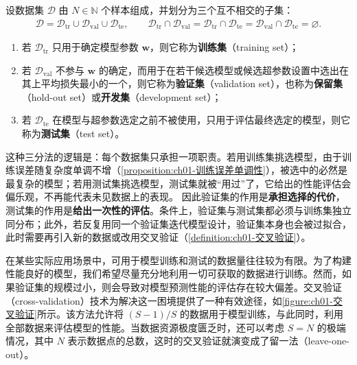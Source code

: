 \documentclass[../../main.tex]{subfiles}
\begin{document}
\begin{definition}[验证集与测试集]\label{definition:ch01-验证集与测试集}
设数据集 $\mathcal{D}$ 由 $N\in\mathbb{N}$ 个样本组成，并划分为三个互不相交的子集：
\begin{align*}
  \mathcal{D}=\mathcal{D}_{\mathrm{tr}}\cup\mathcal{D}_{\mathrm{val}}\cup\mathcal{D}_{\mathrm{te}},\qquad
  \mathcal{D}_{\mathrm{tr}}\cap\mathcal{D}_{\mathrm{val}}=\mathcal{D}_{\mathrm{tr}}\cap\mathcal{D}_{\mathrm{te}}=\mathcal{D}_{\mathrm{val}}\cap\mathcal{D}_{\mathrm{te}}=\varnothing .
\end{align*}
\begin{enumerate}
  \item 若 $\mathcal{D}_{\mathrm{tr}}$ 只用于确定模型参数 $\mathbf{w}$，则它称为\textbf{训练集}（training set）；
  \item 若 $\mathcal{D}_{\mathrm{val}}$ 不参与 $\mathbf{w}$ 的确定，而用于在若干候选模型或候选超参数设置中选出在其上平均损失最小的一个，则它称为\textbf{验证集}（validation set），也称为\textbf{保留集}（hold-out set）或\textbf{开发集}（development set）；
  \item 若 $\mathcal{D}_{\mathrm{te}}$ 在模型与超参数选定之前不被使用，只用于评估最终选定的模型，则它称为\textbf{测试集}（test set）。
\end{enumerate}
\end{definition}

\begin{remark}
这种三分法的逻辑是：每个数据集只承担一项职责。若用训练集挑选模型，由于训练误差随复杂度单调不增（\cref{proposition:ch01-训练误差单调性}），被选中的必然是最复杂的模型；若用测试集挑选模型，测试集就被“用过”了，它给出的性能评估会偏乐观，不再能代表未见数据上的表现。
因此验证集的作用是\textbf{承担选择的代价}，测试集的作用是\textbf{给出一次性的评估}。条件上，验证集与测试集都必须与训练集独立同分布；此外，若反复用同一个验证集迭代模型设计，验证集本身也会被过拟合，此时需要再引入新的数据或改用交叉验证（\cref{definition:ch01-交叉验证}）。
\end{remark}

在某些实际应用场景中，可用于模型训练和测试的数据量往往较为有限。为了构建性能良好的模型，我们希望尽量充分地利用一切可获取的数据进行训练。然而，如果验证集的规模过小，则会导致对模型预测性能的评估存在较大偏差。交叉验证（cross-validation）技术为解决这一困境提供了一种有效途径，如\cref{figure:ch01-交叉验证}所示。该方法允许将 $(S-1)/S$ 的数据用于模型训练，与此同时，利用全部数据来评估模型的性能。当数据资源极度匮乏时，还可以考虑 $S=N$ 的极端情况，其中 $N$ 表示数据点的总数，这时的交叉验证就演变成了留一法（leave-one-out）。
\end{document}
